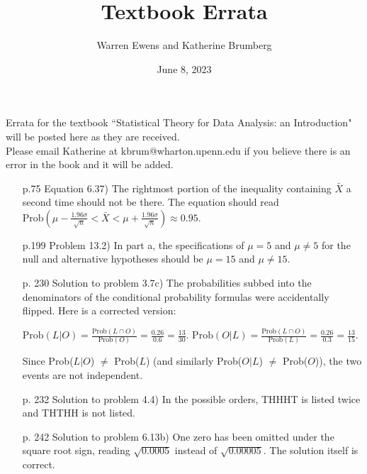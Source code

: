 \documentclass{article}
\title{Textbook Errata}
\author{Warren Ewens and Katherine Brumberg}
\date{June 8, 2023}
\begin{document}
\maketitle

\noindent Errata for the textbook ``Statistical Theory for Data Analysis: an Introduction" will be posted here as they are received. \\

\noindent Please email Katherine at kbrum@wharton.upenn.edu if you believe there is an error in the book and it will be added.


\begin{enumerate}

\item[p.75] Equation 6.37) The rightmost portion of the inequality containing $\bar{X}$ a second time should not be there. The equation should read $\text{Prob}(\mu - \frac{1.96\sigma}{\sqrt{n}} < \bar{X} < \mu + \frac{1.96\sigma}{\sqrt{n}}) \approx 0.95$.

\item[p.199] Problem 13.2) In part a, the specifications of $\mu = 5$ and $\mu \neq 5$ for the null and alternative hypotheses should be $\mu = 15$ and $\mu \neq 15$.

\item[p. 230]  Solution to problem 3.7c) The probabilities subbed into the denominators of the conditional probability formulas were accidentally flipped. Here is a corrected version:

$\text{Prob}(L | O) = \frac{\text{Prob}(L\cap O)}{\text{Prob}(O)} = \frac{0.26}{0.6} = \frac{13}{30}.$
$\text{Prob}(O | L) = \frac{\text{Prob}(L\cap O)}{\text{Prob}(L)} = \frac{0.26}{0.3} =  \frac{13}{15}.$\smallskip

Since Prob($L | O$) $\neq$ Prob($L$) (and similarly Prob($O | L$) $\neq$ Prob($O$)), the two events are not independent.

\item[p. 232] Solution to problem 4.4) In the possible orders, THHHT is listed twice and THTHH is not listed.

\item[p. 242] Solution to problem 6.13b) One zero has been omitted under the square root sign, reading $\sqrt{0.0005}$ instead of $\sqrt{0.00005}$. The solution itself is correct.

\end{enumerate}
\end{document}
